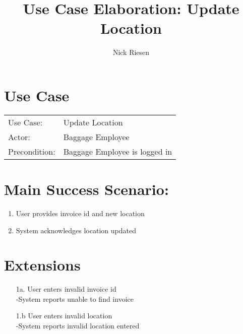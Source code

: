 \documentclass{article}
\title{Use Case Elaboration: Update Location}
\author{ Nick Riesen }
\begin{document}
\maketitle


\section*{Use Case}
\begin{tabular}{l l}
Use Case:     & Update Location               \\
Actor:        & Baggage Employee              \\
Precondition: & Baggage Employee is logged in \\
\end{tabular}


\section*{Main Success Scenario:}

\begin{enumerate}
    \item  User provides invoice id and new location 
    \item System acknowledges location updated

\end{enumerate}

\section*{Extensions}

\begin{itemize}
    \item [1a.] User enters invalid invoice id \\
        -System reports unable to find invoice
             
    \item [1.b] User enters invalid location \\  
        -System reports invalid location entered
        
\end{itemize}
\end{document}
